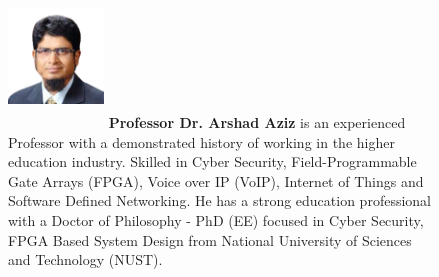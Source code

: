 \documentclass[3p,times]{elsarticle}
\begin{document}
\begin{figure}[h]
\includegraphics[width=1in,height=1.5in,clip,keepaspectratio]{img/Arshad-Aziz.png}
\textbf{Professor Dr. Arshad Aziz} is an experienced Professor with a demonstrated history of working in the higher education industry. Skilled in Cyber Security, Field-Programmable Gate Arrays (FPGA), Voice over IP (VoIP), Internet of Things and Software Defined Networking. He has a strong education professional with a Doctor of Philosophy - PhD (EE) focused in Cyber Security, FPGA Based System Design from National University of Sciences and Technology (NUST).
\end{figure}
\vfill
 

 
\clearpage \newpage













\end{document}
